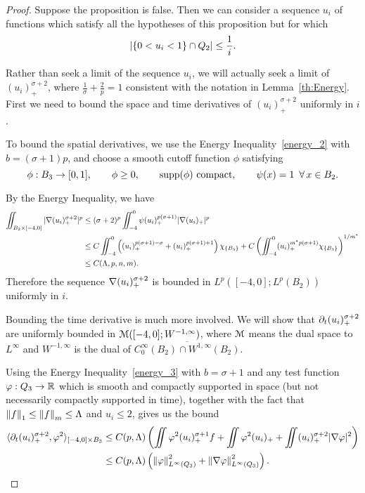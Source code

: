 \begin{proof}
Suppose the proposition is false.  Then we can consider a sequence $u_i$ of functions which satisfy all the hypotheses of this proposition but for which 
\[\left\lvert \{0 < u_i < 1\} \cap Q_2 \right\rvert \leq \frac{1}{i}.\]  

Rather than seek a limit of the sequence $u_i$, we will actually seek a limit of $(u_i)_+^{\sigma+2}$, where $\frac{1}{\sigma} + \frac{2}{p} = 1$ consistent with the notation in Lemma~\ref{th:Energy}.  First we need to bound the space and time derivatives of $(u_i)_+^{\sigma+2}$ uniformly in $i$.  


To bound the spatial derivatives, we use the Energy Inequality~\eqref{energy_2} with $b = (\sigma+1)p$, and choose a smooth cutoff function $\phi$ satisfying
\[ \phi:B_3 \to [0,1], \qquad \phi \geq 0, \qquad \operatorname{supp}(\phi) \textrm{ compact}, \qquad \psi(x)=1 \:\; \forall \, x \in B_2. \]

By the Energy Inequality, we have
\begin{align*} 
\iint_{B_2\times [-4,0]} |\nabla (u_i)_+^{\sigma +2}|^p &\leq (\sigma +2)^p \iint_{-4}^0 \psi (u_i)_+^{p(\sigma +1)} |\nabla (u_i)_+|^p 
\\ &\leq C \iint_{-4}^0 \left(  (u_i)_+^{p(\sigma+1)-\sigma} + (u_i)_+^{p(\sigma+1)+1}  \right) \chi_{\{B_3\}} + C \left( \iint_{-4}^0 (u_i)_+^{m^\ast p(\sigma +1)} \chi_{\{B_3\}}  \right)^{1/m^\ast}
\\ &\leq C(\Lambda,p,n,m).
\end{align*}
Therefore the sequence $\nabla (u_i)_+^{\sigma+2}$ is bounded in $L^p([-4,0];L^p(B_2))$ uniformly in $i$.

Bounding the time derivative is much more involved.  We will show that $\partial_t (u_i)_+^{\sigma+2}$ are uniformly bounded in $\mathcal{M}([-4,0];W^{-1,\infty})$, where $\mathcal{M}$ means the dual space to $L^\infty$ and $W^{-1,\infty}$ is the dual of $\overline{C^\infty_0(B_2) \cap W^{1,\infty}(B_2)}$.  

Using the Energy Inequality~\eqref{energy_3} with $b = \sigma+1$ and any test function $\varphi: Q_3 \to \mathbb{R}$ which is smooth and compactly supported in space (but not necessarily compactly supported in time), together with the fact that $\left\lVert f\right\rVert_1 \leq \left\lVert f\right\rVert_m \leq \Lambda$ and $u_i \leq 2$, gives us the bound
\begin{align*}
\langle \partial_t (u_i)_+^{\sigma+2}, \varphi^2 \rangle_{[-4,0]\times B_3} &\leq C(p,\Lambda) \left(  \iint \varphi^2 (u_i)_+^{\sigma+1}f + \iint \varphi^2 (u_i)_+ + \iint (u_i)_+^{\sigma+2} |\nabla \varphi|^2  \right)
\\ &\leq C(p,\Lambda) \left(  \left\lVert\varphi\right\rVert_{L^\infty(Q_3)}^2 + \left\lVert\nabla \varphi\right\rVert_{L^\infty(Q_3)}^2  \right).
\end{align*}


\end{proof}
